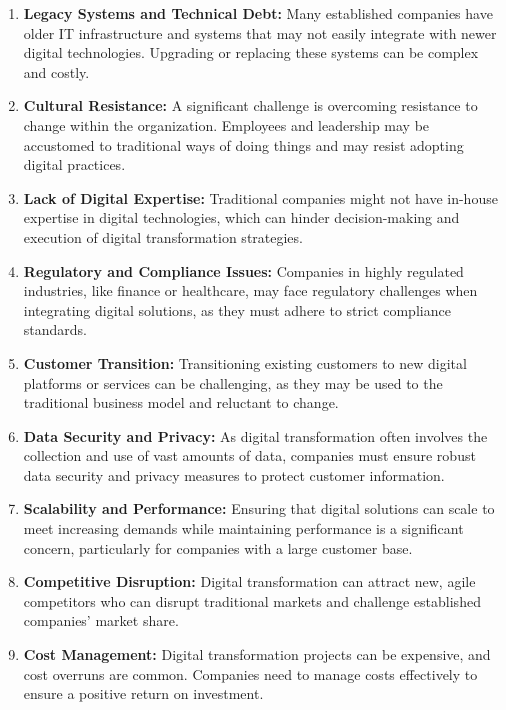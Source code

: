 \documentclass[a4]{scrartcl}
\begin{document}
	\begin{enumerate}
		\item \textbf{Legacy Systems and Technical Debt:} Many established companies have older IT infrastructure and systems that may not easily integrate with newer digital technologies. Upgrading or replacing these systems can be complex and costly.
		
		\item \textbf{Cultural Resistance:} A significant challenge is overcoming resistance to change within the organization. Employees and leadership may be accustomed to traditional ways of doing things and may resist adopting digital practices.
		
		\item \textbf{Lack of Digital Expertise:} Traditional companies might not have in-house expertise in digital technologies, which can hinder decision-making and execution of digital transformation strategies.
		
		\item \textbf{Regulatory and Compliance Issues:} Companies in highly regulated industries, like finance or healthcare, may face regulatory challenges when integrating digital solutions, as they must adhere to strict compliance standards.
		
		\item \textbf{Customer Transition:} Transitioning existing customers to new digital platforms or services can be challenging, as they may be used to the traditional business model and reluctant to change.
		
		\item \textbf{Data Security and Privacy:} As digital transformation often involves the collection and use of vast amounts of data, companies must ensure robust data security and privacy measures to protect customer information.
		
		\item \textbf{Scalability and Performance:} Ensuring that digital solutions can scale to meet increasing demands while maintaining performance is a significant concern, particularly for companies with a large customer base.
		
		\item \textbf{Competitive Disruption:} Digital transformation can attract new, agile competitors who can disrupt traditional markets and challenge established companies' market share.
		
		\item \textbf{Cost Management:} Digital transformation projects can be expensive, and cost overruns are common. Companies need to manage costs effectively to ensure a positive return on investment.
		

\end{enumerate}
\end{document}
